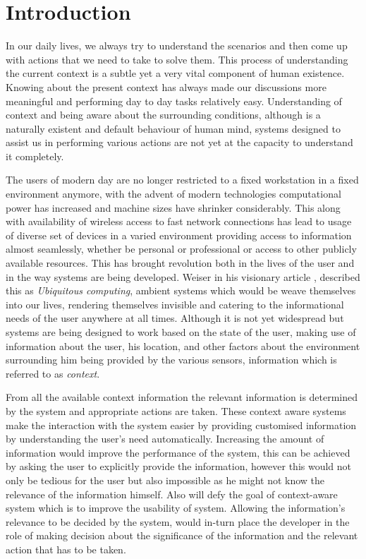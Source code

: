 \documentclass[12pt]{report}
\begin{document}
\tableofcontents
\listoffigures
\listoftables
\newpage

\chapter{Introduction}
\noindent
In our daily lives, we always try to understand the scenarios and then come up with actions that we need to take to solve them. This process of understanding the current context is a subtle yet a very vital component of human existence. Knowing about the present context has always made our discussions more meaningful and performing day to day tasks relatively easy. Understanding of context and being aware about the surrounding conditions, although is a naturally existent and default behaviour of human mind, systems designed to assist us in performing various actions are not yet at the capacity to understand it completely.

The users of modern day are no longer restricted to a fixed workstation in a fixed environment anymore, with the advent of modern technologies computational power has increased and machine sizes have shrinker considerably. This along with availability of wireless access to fast network connections has lead to usage of diverse set of devices in a varied environment providing access to information almost seamlessly, whether be personal or professional or access to other publicly available resources. This has brought revolution both in the lives of the user and in the way systems are being developed. Weiser in his visionary article \cite{weiser1991computer}, described this as \textit{Ubiquitous computing}, ambient systems which would be weave themselves into our lives, rendering themselves invisible and catering to the informational needs of the user anywhere at all times. Although it is not yet widespread but systems are being designed to work based on the state of the user, making use of information about the user, his location, and other factors about the environment surrounding him being provided by the various sensors, information which is referred to as \textit{context}.


From all the available context information the relevant information is determined by the system and appropriate actions are taken. These context aware systems make the interaction with the system easier by providing customised information by understanding the user's need automatically. Increasing the amount of information would improve the performance of the system, this can be achieved by asking the user to explicitly provide the information, however this would not only be tedious for the user but also impossible as he might not know the relevance of the information himself. Also will defy the goal of context-aware system which is to improve the usability of system. Allowing the information's relevance to be decided by the system, would in-turn place the developer in the role of making decision about the significance of the information and the relevant action that has to be taken.
\end{document}
